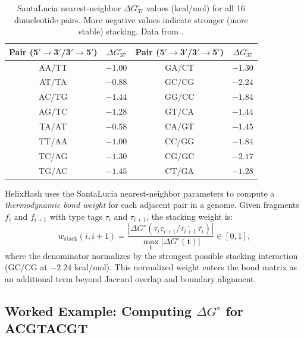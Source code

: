 \begin{table}[H]
\centering
\caption{SantaLucia nearest-neighbor $\Delta G^{\circ}_{37}$ values (kcal/mol) for all 16 dinucleotide pairs. More negative values indicate stronger (more stable) stacking. Data from \citet{santalucia1998}.}
\label{tab:nn-params}
\begin{tabular}{cccc}
\toprule
\textbf{Pair (5\('\to\)3\('\)/3\('\to\)5\('\))} & \textbf{$\Delta G^{\circ}_{37}$} & \textbf{Pair (5\('\to\)3\('\)/3\('\to\)5\('\))} & \textbf{$\Delta G^{\circ}_{37}$} \\
\midrule
AA/TT & $-1.00$ & GA/CT & $-1.30$ \\
AT/TA & $-0.88$ & GC/CG & $-2.24$ \\
AC/TG & $-1.44$ & GG/CC & $-1.84$ \\
AG/TC & $-1.28$ & GT/CA & $-1.44$ \\
TA/AT & $-0.58$ & CA/GT & $-1.45$ \\
TT/AA & $-1.00$ & CC/GG & $-1.84$ \\
TC/AG & $-1.30$ & CG/GC & $-2.17$ \\
TG/AC & $-1.45$ & CT/GA & $-1.28$ \\
\bottomrule
\end{tabular}
\end{table}

\begin{implnote}
HelixHash uses the SantaLucia nearest-neighbor parameters to compute a \emph{thermodynamic bond weight} for each adjacent pair in a genome. Given fragments $f_i$ and $f_{i+1}$ with type tags $\tau_i$ and $\tau_{i+1}$, the stacking weight is:
\begin{equation}
w_{\text{stack}}(i, i+1) = \frac{|\Delta G^{\circ}(\tau_i \tau_{i+1} / \overline{\tau_{i+1}}\, \overline{\tau_i})|}{\max_{\mathbf{t}} |\Delta G^{\circ}(\mathbf{t})|} \in [0, 1],
\end{equation}
where the denominator normalizes by the strongest possible stacking interaction (GC/CG at $-2.24$ kcal/mol). This normalized weight enters the bond matrix as an additional term beyond Jaccard overlap and boundary alignment.
\end{implnote}

\subsection{Worked Example: Computing $\Delta G^{\circ}$ for \textsf{ACGTACGT}}
\label{subsec:free-energy-example}

